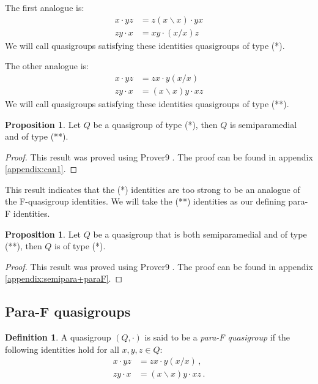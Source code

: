 \documentclass[12pt, twoside, openright]{report}
\theoremstyle{definition}
\newtheorem{prp}[thm]{Proposition}
\newtheorem{dfn}[thm]{Definition}
\newcommand{\ldv}{\backslash}       %
\newcommand{\rdv}{/}                %
\begin{document}
The first analogue is:
\begin{align*}
  x\cdot yz &= z(x\ldv x)\cdot yx\\
  zy\cdot x &= xy\cdot (x\rdv x)z
\end{align*}
We will call quasigroups satisfying these identities quasigroups of type (*).

The other analogue is:
\begin{align*}
  x\cdot yz &= zx\cdot y(x\rdv x)\\
  zy\cdot x &= (x\ldv x)y\cdot xz
\end{align*}
We will call quasigroups satisfying these identities quasigroups of type (**).

\begin{prp}\label{can1}
  Let $Q$ be a quasigroup of type (*), then $Q$ is semiparamedial and of type (**). 
\end{prp}

\begin{proof}
  This result was proved using Prover9 \cite{Prover9}. The proof can be found in appendix \ref{appendix:can1}.
\end{proof}

This result indicates that the (*) identities are too strong to be an analogue of the F-quasigroup
  identities. We will take the (**) identities as our defining para-F identities.

\begin{prp}\label{semipara+paraF}
  Let $Q$ be a quasigroup that is both semiparamedial and of type (**), then $Q$ is of type (*).
\end{prp}

\begin{proof}
  This result was proved using Prover9 \cite{Prover9}. The proof can be found in
    appendix \ref{appendix:semipara+paraF}.
\end{proof}

\subsection{Para-F quasigroups}

\begin{dfn}
  A quasigroup $(Q,\cdot)$ is said to be a \emph{para-F quasigroup} if the following identities
    hold for all $x,y,z\in Q$:
  \begin{align}
    x\cdot yz &= zx\cdot y(x\rdv x)\,,  \label{eq:pF1}  \tag{P1} \\
    zy\cdot x &= (x\ldv x)y\cdot xz\,.  \label{eq:pF2}  \tag{P2}
  \end{align}
\end{dfn}
\end{document}
